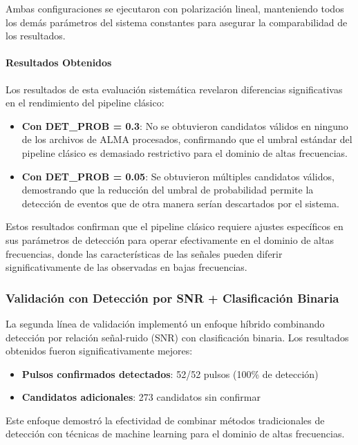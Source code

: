 Ambas configuraciones se ejecutaron con polarización lineal, manteniendo todos los demás parámetros del sistema constantes para asegurar la comparabilidad de los resultados.

\paragraph{Resultados Obtenidos}

Los resultados de esta evaluación sistemática revelaron diferencias significativas en el rendimiento del pipeline clásico:

\begin{itemize}
    \item \textbf{Con DET\_PROB = 0.3}: No se obtuvieron candidatos válidos en ninguno de los archivos de ALMA procesados, confirmando que el umbral estándar del pipeline clásico es demasiado restrictivo para el dominio de altas frecuencias.
    \item \textbf{Con DET\_PROB = 0.05}: Se obtuvieron múltiples candidatos válidos, demostrando que la reducción del umbral de probabilidad permite la detección de eventos que de otra manera serían descartados por el sistema.
\end{itemize}

Estos resultados confirman que el pipeline clásico requiere ajustes específicos en sus parámetros de detección para operar efectivamente en el dominio de altas frecuencias, donde las características de las señales pueden diferir significativamente de las observadas en bajas frecuencias.

\subsubsection{Validación con Detección por SNR + Clasificación Binaria}

La segunda línea de validación implementó un enfoque híbrido combinando detección por relación señal-ruido (SNR) con clasificación binaria. Los resultados obtenidos fueron significativamente mejores:

\begin{itemize}
    \item \textbf{Pulsos confirmados detectados}: 52/52 pulsos (100\% de detección)
    \item \textbf{Candidatos adicionales}: 273 candidatos sin confirmar
\end{itemize}

Este enfoque demostró la efectividad de combinar métodos tradicionales de detección con técnicas de machine learning para el dominio de altas frecuencias.


